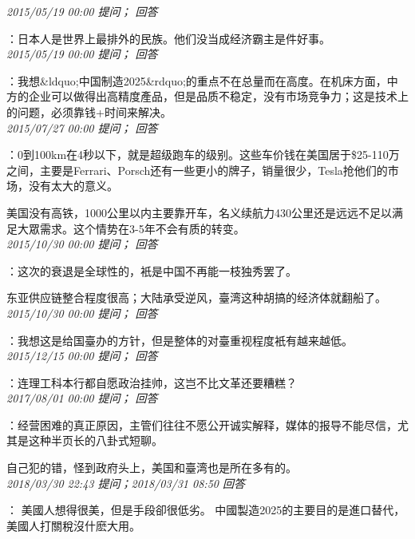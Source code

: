 \documentclass[twocolumn]{ctexart}
\begin{document}
\textit{\hfill\noindent\small 2015/05/19 00:00 提问； 回答}

：日本人是世界上最排外的民族。他们没当成经济霸主是件好事。\\

\textit{\hfill\noindent\small 2015/05/19 00:00 提问； 回答}

：我想\&ldquo;中国制造2025\&rdquo;的重点不在总量而在高度。在机床方面，中方的企业可以做得出高精度產品，但是品质不稳定，没有市场竞争力；这是技术上的问题，必须靠钱+时间来解决。\\

\textit{\hfill\noindent\small 2015/07/27 00:00 提问； 回答}

：0到100km在4秒以下，就是超级跑车的级别。这些车价钱在美国居于\$25-110万之间，主要是Ferrari、Porsch还有一些更小的牌子，销量很少，Tesla抢他们的市场，没有太大的意义。

美国没有高铁，1000公里以内主要靠开车，名义续航力430公里还是远远不足以满足大眾需求。这个情势在3-5年不会有质的转变。\\

\textit{\hfill\noindent\small 2015/10/30 00:00 提问； 回答}

：这次的衰退是全球性的，衹是中国不再能一枝独秀罢了。

东亚供应链整合程度很高；大陆承受逆风，臺湾这种胡搞的经济体就翻船了。\\

\textit{\hfill\noindent\small 2015/10/30 00:00 提问； 回答}

：我想这是给国臺办的方针，但是整体的对臺重视程度衹有越来越低。\\

\textit{\hfill\noindent\small 2015/12/15 00:00 提问； 回答}

：连理工科本行都自愿政治挂帅，这岂不比文革还要糟糕？\\

\textit{\hfill\noindent\small 2017/08/01 00:00 提问； 回答}

：经营困难的真正原因，主管们往往不愿公开诚实解释，媒体的报导不能尽信，尤其是这种半页长的八卦式短聊。

自己犯的错，怪到政府头上，美国和臺湾也是所在多有的。\\

\textit{\hfill\noindent\small 2018/03/30 22:43 提问；2018/03/31 08:50 回答}

：
美國人想得很美，但是手段卻很低劣。
中國製造2025的主要目的是進口替代，美國人打關稅沒什麽大用。
\\
\end{document}
